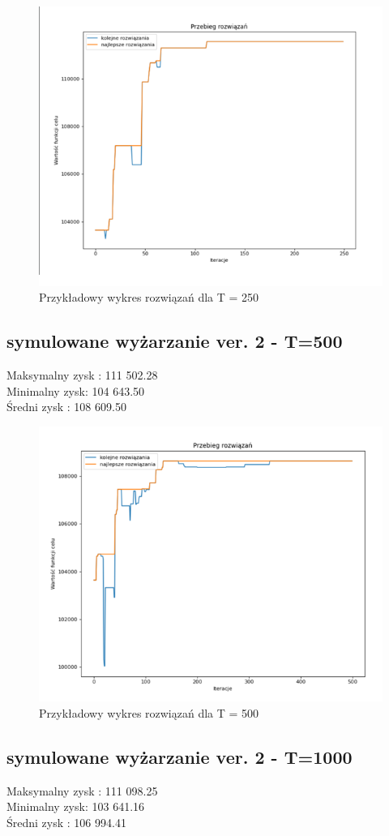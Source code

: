\documentclass{article}
\begin{document}
\begin{figure}[H]
	\centering
	\includegraphics[width=0.7\linewidth]{screens/AnneallingV2_250}
	\caption{Przykładowy wykres rozwiązań dla T = 250}
	\label{fig:anneallingv2250}
\end{figure}


\subsection{symulowane wyżarzanie ver. 2 - T=500}
Maksymalny zysk : 111 502.28 \\
Minimalny zysk: 104 643.50 \\
Średni zysk : 108 609.50 \\

\begin{figure}[H]
	\centering
	\includegraphics[width=0.7\linewidth]{screens/AnneallingV2_500}
	\caption{Przykładowy wykres rozwiązań dla T = 500}
	\label{fig:anneallingv2500}
\end{figure}


\subsection{symulowane wyżarzanie ver. 2 - T=1000}
Maksymalny zysk : 111 098.25 \\
Minimalny zysk: 103 641.16 \\
Średni zysk : 106 994.41 \\
\end{document}
